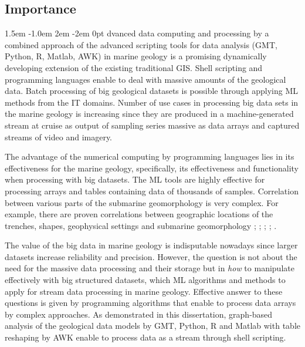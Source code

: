 \documentclass[11pt,a4paper]{report}
\def\pstart#1{\noindent\smash{\lower1.5ex\hbox{\llap{\Cal#1}}\hskip-.1ex}
  \parshape=3 1.5em \dimexpr\hsize-1.0em 2em \dimexpr\hsize-2em 0pt \hsize}
\begin{document}
\subsection{Importance}
\pstart Advanced data computing and processing by a combined approach of the advanced scripting tools for data analysis (\ac{GMT}, Python, R, Matlab, AWK) in marine geology is a promising dynamically developing extension of the existing traditional \ac{GIS}. Shell scripting and programming languages enable to deal with massive amounts of the geological data. Batch processing of big geological datasets is possible through applying \ac{ML} methods from the \ac{IT} domains. Number of use cases in processing big data sets in the marine geology is increasing since they are produced in a machine-generated stream at cruise as output of sampling series massive as data arrays and captured streams of video and imagery. 

The advantage of the numerical computing by programming languages lies in its effectiveness for the marine geology, specifically, its effectiveness and functionality when processing with big datasets. The \ac{ML} tools are highly effective for processing arrays and tables containing data of thousands of samples. Correlation between various parts of the submarine geomorphology is very complex. For example, there are proven correlations between geographic locations of the trenches, shapes, geophysical settings and submarine geomorphology \cite{MckenzieBowin1976}; \cite{SandwellSmith2009}; \cite{JimenezDiazetal2014}; \cite{JudgeMcNutt1991}; \cite{KalninsWatts2009}. 

The value of the big data in marine geology is indisputable nowadays since larger datasets increase reliability and precision. However, the question is not about the need for the massive data processing and their storage but in \emph{how} to manipulate effectively with big structured datasets, which \ac{ML} algorithms and methods to apply for stream data processing in marine geology. Effective answer to these questions is given by programming algorithms that enable to process data arrays by complex approaches. As demonstrated in this dissertation, graph-based analysis of the geological data models by \ac{GMT}, Python, R and Matlab with table reshaping by AWK enable to process data as a stream through shell scripting. 
\end{document}
